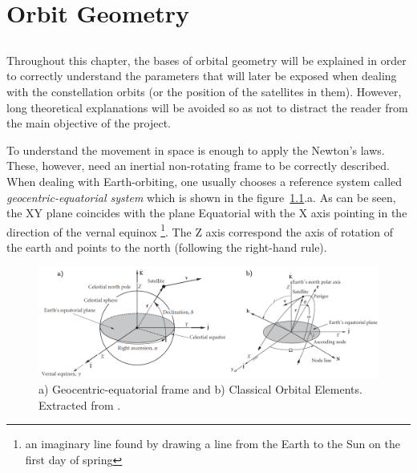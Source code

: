 \chapter{Orbit Geometry}


\section*{}
Throughout this chapter, the bases of orbital geometry will be explained in order to correctly understand the parameters that will later be exposed when dealing with the constellation orbits (or the position of the satellites in them). However, long theoretical explanations will be avoided so as not to distract the reader from the main objective of the project.

To understand the movement in space is enough to apply the Newton's laws. These, however, need an inertial non-rotating frame to be correctly described. When dealing with Earth-orbiting, one usually chooses a reference system called \textit{geocentric-equatorial system} which is shown in the figure~\ref{fig:eqframe}.a. As can be seen, the XY plane coincides with the plane Equatorial with the X axis pointing in the direction of the vernal equinox \footnote{an imaginary line found by drawing a line from the Earth to the Sun on the first day of spring}. The Z axis correspond the axis of rotation of the earth and points to the north (following the right-hand rule).

\begin{figure}[H]
\centering
\includegraphics[scale=.35]{./Geometry/fig-Ch1-Geometry/COE&eqframe.png}
\caption[a) Geocentric-equatorial frame and b) Classical Orbital Elements]{a) Geocentric-equatorial frame and b) Classical Orbital Elements. Extracted from \cite{Howard}.}
\label{fig:eqframe}
\end{figure}

